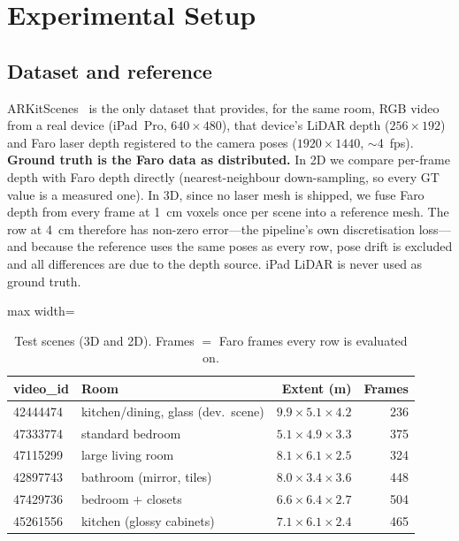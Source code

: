 \section{Experimental Setup}\label{sec:setup}

\subsection{Dataset and reference}
ARKitScenes~\cite{arkitscenes} is the only dataset that provides, for the same room, RGB video from a real device
(iPad~Pro, $640\times480$), that device's LiDAR depth ($256\times192$) and Faro laser depth registered to the camera
poses ($1920\times1440$, $\sim$4~fps). \textbf{Ground truth is the Faro data as distributed.} In 2D we compare per-frame
depth with Faro depth directly (nearest-neighbour down-sampling, so every GT value is a measured one). In 3D, since no
laser mesh is shipped, we fuse Faro depth from every frame at \SI{1}{cm} voxels once per scene into a reference mesh.
The  row at \SI{4}{cm} therefore has non-zero error---the pipeline's own discretisation loss---and because
the reference uses the same poses as every row, pose drift is excluded and all differences are due to the depth source.
iPad LiDAR is never used as ground truth.

\begin{table}[t]
\centering\small
\caption{Test scenes (3D and 2D). Frames $=$ Faro frames every row is evaluated on.}
\label{tab:scenes}
\begin{adjustbox}{max width=\columnwidth}
\begin{tabular}{@{}llrr@{}}
\toprule
video\_id & Room & Extent (m) & Frames \\
\midrule
42444474 & kitchen/dining, glass (dev.\ scene) & $9.9\times5.1\times4.2$ & 236 \\
47333774 & standard bedroom & $5.1\times4.9\times3.3$ & 375 \\
47115299 & large living room & $8.1\times6.1\times2.5$ & 324 \\
42897743 & bathroom (mirror, tiles) & $8.0\times3.4\times3.6$ & 448 \\
47429736 & bedroom $+$ closets & $6.6\times6.4\times2.7$ & 504 \\
45261556 & kitchen (glossy cabinets) & $7.1\times6.1\times2.4$ & 465 \\
\bottomrule
\end{tabular}
\end{adjustbox}
\end{table}

